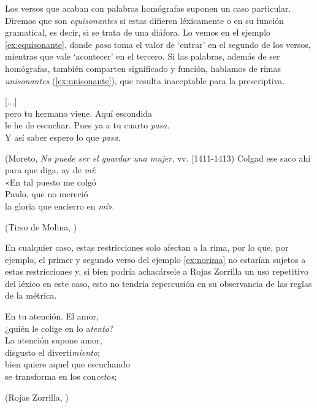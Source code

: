Los versos que acaban con palabras homógrafas suponen un caso particular. Diremos que son \textit{equisonantes} si estas difieren léxicamente o en su función gramatical, es decir, si se trata de una diáfora. Lo vemos en el ejemplo \ref{ex:equisonante}, donde \textit{pasa} toma el valor de `entrar' en el segundo de los versos, mientras que vale `acontecer' en el tercero. Si las palabras, además de ser homógrafas, también comparten significado y función, hablamos de rimas \textit{unisonantes} (\ref{ex:unisonante}), que resulta inaceptable para la prescriptiva.
\begin{exe}
		\ex\label{ex:equisonante}
		[...]\\
		pero tu hermano viene. Aquí escondida\\
		le he de escuchar. Pues ya a tu cuarto \textit{pasa}.\\
		Y así saber espero lo que \textit{pasa}.\\
		\strut\hfill(Moreto, \textit{No puede ser el guardar una mujer}, vv. [1411-1413\nocite{moreto_nopuedeser})
	\ex\label{ex:unisonante}Colgad ese saco ahí\\
	para que diga, ay de \textit{mí}:\\
	«En tal puesto me colgó\\
	Paulo, que no mereció\\
	la gloria que encierro en \textit{mí}».\\
	\strut\hfill(Tirso de Molina, )                                         \end{exe}
En cualquier caso, estas restricciones solo afectan a la rima, por lo que, por ejemplo, el primer y segundo verso del ejemplo \ref{ex:norima} no estarían sujetos a estas restricciones y, si bien podría achacársele a Rojas Zorrilla un uso repetitivo del léxico en este caso, esto no tendría repercusión en su observancia de las reglas de la métrica.
\begin{exe}	
\ex\label{ex:norima}En tu atención. El amor,\\
¿quién le colige en lo a\textit{tento}?\\
La atención supone amor,\\
disgusto el diverti\textit{miento};\\
bien quiere aquel que escuchando\\
se transforma en los con\textit{cetos};\\
\strut\hfill(Rojas Zorrilla, )
\end{exe}

